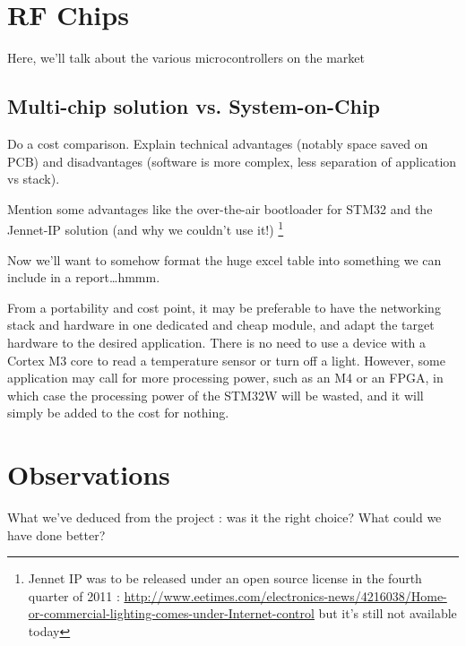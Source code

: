 \section{RF Chips}\label{sec:chips}

Here, we'll talk about the various microcontrollers on the market

\subsection{Multi-chip solution vs. System-on-Chip}

Do a cost comparison. 
Explain technical advantages (notably space saved on PCB) and disadvantages
(software is more complex, less separation of application vs stack).

Mention some advantages like the over-the-air bootloader for STM32 and the
Jennet-IP solution (and why we couldn't use it!) \footnote{Jennet IP was to be
released under an open source license in the fourth quarter of 2011
: \url{http://www.eetimes.com/electronics-news/4216038/Home-or-commercial-lighting-comes-under-Internet-control}
but it's still not available today}

Now we'll want to somehow format the huge excel table into something we can
include in a report\ldots hmmm.


From a portability and cost point, it may be preferable to have the networking
stack and hardware in one dedicated and cheap module, and adapt the target
hardware to the desired application. There is no need to use a device with
a Cortex M3 core to read a temperature sensor or turn off a light. However, some
application may call for more processing power, such as an M4 or an FPGA, in
which case the processing power of the STM32W will be wasted, and it will simply
be added to the cost for nothing.

\section{Observations}

What we've deduced from the project : was it the right choice? What could we
have done better?

